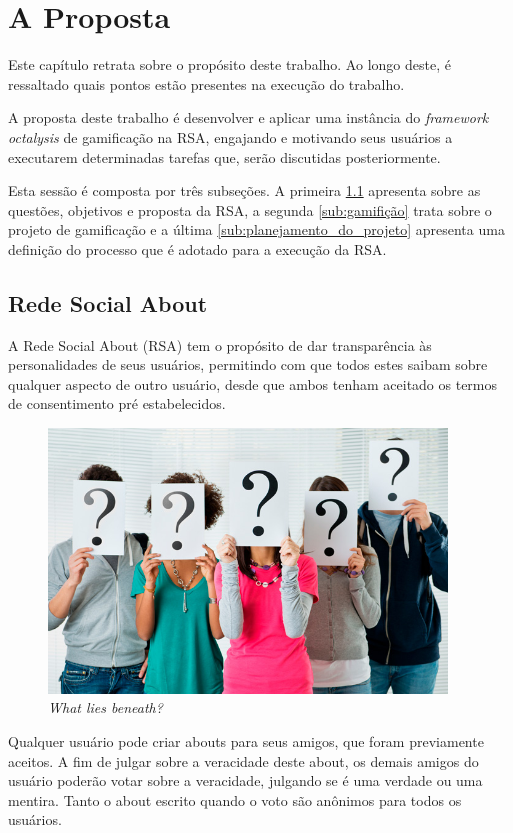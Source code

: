 \chapter[A Proposta]{A Proposta}

Este capítulo retrata sobre o propósito deste trabalho. Ao longo deste, é ressaltado quais
pontos estão presentes na execução do trabalho.

A proposta deste trabalho é desenvolver e aplicar uma instância do \textit{framework} \textit{octalysis} de gamificação na RSA, engajando e
motivando seus usuários a executarem determinadas tarefas que, serão discutidas posteriormente.

Esta sessão é composta por três subseções. A primeira \ref{sub:redesocialabout} apresenta sobre
as questões, objetivos e proposta da RSA, a segunda \ref{sub:gamifição} trata
sobre o projeto de gamificação e a última \ref{sub:planejamento_do_projeto} apresenta uma definição
do processo que é adotado para a execução da RSA.

\section{Rede Social About}
\label{sub:redesocialabout}
A Rede Social About (RSA) tem o propósito de dar transparência às personalidades de seus usuários, permitindo com que todos
estes saibam sobre qualquer aspecto de outro usuário, desde que ambos tenham aceitado os
termos de consentimento pré estabelecidos.

\begin{figure}[h]
    \centering
    \includegraphics[width=400px, scale=1]{figuras/pessoas-duvida}
    \caption{\textit{What lies beneath?}}
    \label{fig:pessoas-duvida}
\end{figure}

Qualquer usuário pode criar abouts para seus amigos, que foram previamente aceitos. A fim de julgar
sobre a veracidade deste about, os demais amigos do usuário poderão votar sobre a veracidade,
julgando se é uma verdade ou uma mentira. Tanto o about escrito quando o voto são anônimos para todos os
usuários.

